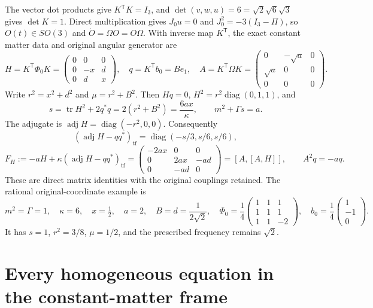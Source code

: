 \documentclass[11pt]{article}
\newcommand{\tf}{\mathrm{tf}}
\newcommand{\tr}{\operatorname{tr}}
\begin{document}
The vector dot products give $K^{\mathsf T}K=I_3$, and
$\det(v,w,u)=6=\sqrt2\sqrt6\sqrt3$ gives $\det K=1$.
Direct multiplication gives $J_0u=0$ and
$J_0^2=-3(I_3-\Pi)$, so $O(t)\in SO(3)$ and
$\dot O=\Omega O=O\Omega$. With inverse map $K^{\mathsf T}$, the exact
constant matter data and original angular generator are
\[
 H=K^{\mathsf T}\Phi_0K=
 \begin{pmatrix}0&0&0\\0&-x&d\\0&d&x\end{pmatrix},\quad
 q=K^{\mathsf T}b_0=Be_1,\quad
 A=K^{\mathsf T}\Omega K=
 \begin{pmatrix}0&-\sqrt a&0\\\sqrt a&0&0\\0&0&0\end{pmatrix}.
\]
Write $r^2=x^2+d^2$ and $\mu=r^2+B^2$.
Then $Hq=0$, $H^2=r^2\operatorname{diag}(0,1,1)$, and
\[
 s=\tr H^2+2q^*q=2(r^2+B^2)=\frac{6ax}{\kappa},
 \qquad m^2+\Gamma s=a.
\]
The adjugate is $\operatorname{adj}H=\operatorname{diag}(-r^2,0,0)$.
Consequently
\[
 (\operatorname{adj}H-qq^*)_{\tf}
 =\operatorname{diag}(-s/3,s/6,s/6),
\]
\begin{equation}\label{eq:force}
 F_H:=-aH+\kappa(\operatorname{adj}H-qq^*)_{\tf}
 =\begin{pmatrix}-2ax&0&0\\0&2ax&-ad\\0&-ad&0\end{pmatrix}
 =[A,[A,H]],\qquad A^2q=-aq.
\end{equation}
These are direct matrix identities with the original couplings retained.
The rational original-coordinate example is
\[
 m^2=\Gamma=1,\quad\kappa=6,\quad x=\tfrac12,\quad a=2,
 \quad B=d=\frac{1}{2\sqrt2},\quad
 \Phi_0=\frac14\begin{pmatrix}1&1&1\\1&1&1\\1&1&-2\end{pmatrix},
 \quad b_0=\frac14\begin{pmatrix}1\\-1\\0\end{pmatrix}.
\]
It has $s=1$, $r^2=3/8$, $\mu=1/2$, and the prescribed frequency remains
$\sqrt2$.

\section{Every homogeneous equation in the constant-matter frame}
\end{document}
